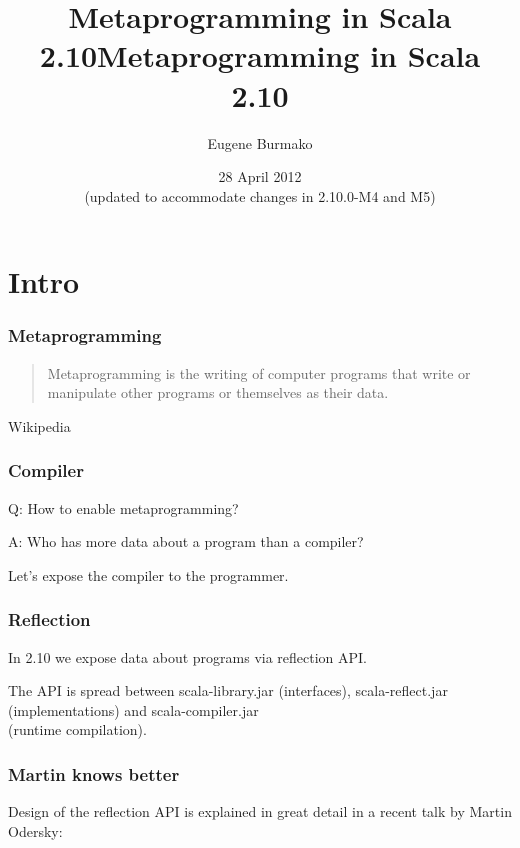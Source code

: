 \documentclass[hyperref={bookmarks=false}]{beamer}
\title{Metaprogramming in Scala 2.10}
\begin{document}
\title{Metaprogramming in Scala 2.10}
\author{Eugene Burmako}
\date{28 April 2012 \\ (updated to accommodate changes in 2.10.0-M4 and M5)}
\maketitle

\section{Intro}

\begin{frame}[fragile]
\frametitle{Metaprogramming}

\begin{quote}
Metaprogramming is the writing of computer programs that write or manipulate other programs or themselves as their data.
\end{quote}

\begin{flushright}
\textemdash Wikipedia
\end{flushright}

\end{frame}

\begin{frame}[fragile]
\frametitle{Compiler}

Q: How to enable metaprogramming?

A: Who has more data about a program than a compiler?

Let's expose the compiler to the programmer.

\end{frame}

\begin{frame}[fragile]
\frametitle{Reflection}

In 2.10 we expose data about programs via reflection API.

The API is spread between scala-library.jar (interfaces), scala-reflect.jar (implementations) and scala-compiler.jar \\ (runtime compilation).

\end{frame}

\begin{frame}[fragile]
\frametitle{Martin knows better}

Design of the reflection API is explained in great detail in a recent talk by Martin Odersky:


\end{frame}
\end{document}

